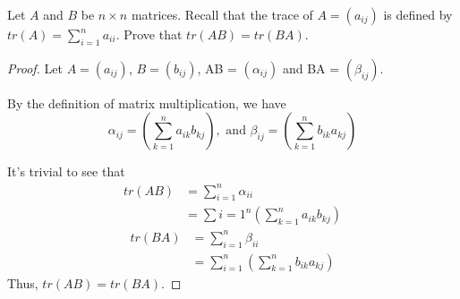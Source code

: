 \begin{homeworkProblem}

Let $A$ and $B$ be $n \times n$ matrices. Recall that the trace of $A = (a_{ij})$ is defined by $tr(A) = \sum_{i=1}^{n} a_{ii}$. Prove that $tr(AB) = tr(BA)$.

\segline

\solution

\begin{proof}

Let $A = (a_{ij})$, $B = (b_{ij})$, AB = $(\alpha_{ij})$ and BA = $(\beta_{ij})$.

By the definition of matrix multiplication, we have
\[
    \alpha_{ij} = (\sum_{k=1}^{n} a_{ik} b_{kj}), \text{ and }
    \beta_{ij} = (\sum_{k=1}^{n}b_{ik} a_{kj})
\]

It's trivial to see that
\[
\begin{aligned}
    tr(AB) &= \sum_{i=1}^{n} \alpha_{ii} \\
           &= \sum{i=1}^{n}\left(\sum_{k=1}^{n}a_{ik}b_{kj}\right)
\end{aligned}
\]
\[
\begin{aligned}
    tr(BA) &= \sum_{i=1}^{n} \beta_{ii} \\
           &= \sum_{i=1}^{n}\left(\sum_{k=1}^{n}b_{ik}a_{kj}\right)
\end{aligned}
\]
Thus, $tr(AB) = tr(BA)$.

\end{proof}
\end{homeworkProblem}
